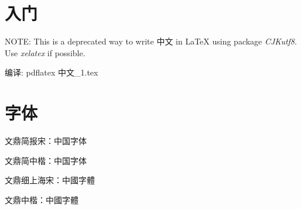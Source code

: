 \documentclass{article}
\begin{document}
\begin{CJK}{UTF8}{gbsn}

    \section{入门}
    NOTE: This is a deprecated way to write 中文 in \LaTeX{} using package
    \emph{CJKutf8}.  Use \emph{xelatex} if possible.

    编译: pdflatex 中文\_1.tex

    \section{字体}

    {
    文鼎简报宋：中国字体}

    {
    文鼎简中楷：中国字体}

    {
    文鼎细上海宋：中國字體}

    {
    文鼎中楷：中國字體}

\clearpage
\end{CJK}
\end{document}
